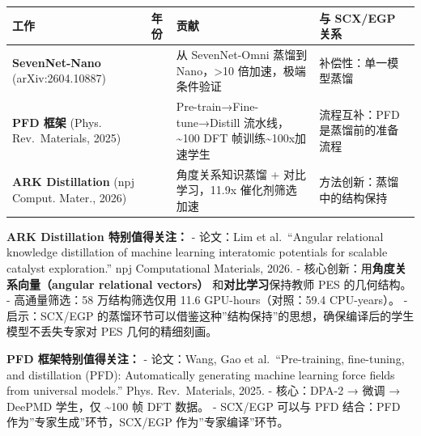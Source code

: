 \documentclass[
  12pt,
]{ctexart}
\begin{document}
\begin{longtable}[]{@{}
  >{\raggedright\arraybackslash}p{}
  >{\raggedright\arraybackslash}p{}
  >{\raggedright\arraybackslash}p{}
  >{\raggedright\arraybackslash}p{}@{}}
\toprule\noalign{}
\begin{minipage}[b]{\linewidth}\raggedright
工作
\end{minipage} & \begin{minipage}[b]{\linewidth}\raggedright
年份
\end{minipage} & \begin{minipage}[b]{\linewidth}\raggedright
贡献
\end{minipage} & \begin{minipage}[b]{\linewidth}\raggedright
与 SCX/EGP 关系
\end{minipage} \\
\midrule\noalign{}
\endhead
\bottomrule\noalign{}
\endlastfoot
\textbf{SevenNet-Nano} (arXiv:2604.10887) & 2026 & 从 SevenNet-Omni
蒸馏到 Nano，\textgreater10 倍加速，极端条件验证 &
补偿性：单一模型蒸馏 \\
\textbf{PFD 框架} (Phys. Rev.~Materials, 2025) & 2025 &
Pre-train→Fine-tune→Distill 流水线，\textasciitilde100 DFT
帧训练\textasciitilde100x加速学生 & 流程互补：PFD 是蒸馏前的准备流程 \\
\textbf{ARK Distillation} (npj Comput. Mater., 2026) & 2026 &
角度关系知识蒸馏 + 对比学习，11.9x 催化剂筛选加速 &
方法创新：蒸馏中的结构保持 \\
\end{longtable}

\textbf{ARK Distillation 特别值得关注：} - 论文：Lim et al.~``Angular
relational knowledge distillation of machine learning interatomic
potentials for scalable catalyst exploration.'' npj Computational
Materials, 2026. - 核心创新：用\textbf{角度关系向量（angular relational
vectors）} 和\textbf{对比学习}保持教师 PES 的几何结构。 - 高通量筛选：58
万结构筛选仅用 11.6 GPU-hours（对照：59.4 CPU-years）。 - 启示：SCX/EGP
的蒸馏环节可以借鉴这种''结构保持''的思想，确保编译后的学生模型不丢失专家对
PES 几何的精细刻画。

\textbf{PFD 框架特别值得关注：} - 论文：Wang, Gao et al.~``Pre-training,
fine-tuning, and distillation (PFD): Automatically generating machine
learning force fields from universal models.'' Phys. Rev.~Materials,
2025. - 核心：DPA-2 → 微调 → DeePMD 学生，仅 \textasciitilde100 帧 DFT
数据。 - SCX/EGP 可以与 PFD 结合：PFD 作为''专家生成''环节，SCX/EGP
作为''专家编译''环节。
\end{document}
